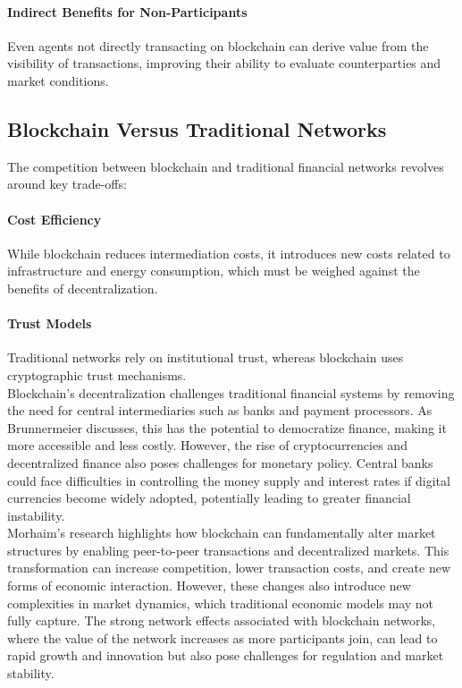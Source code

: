 \paragraph{Indirect Benefits for Non-Participants}
Even agents not directly transacting on blockchain can derive value from the visibility of transactions, improving their ability to evaluate counterparties and market conditions. \cite{iyengar_economics_2023}

\subsection{Blockchain Versus Traditional Networks}

The competition between blockchain and traditional financial networks revolves around key trade-offs:

\paragraph{Cost Efficiency}
While blockchain reduces intermediation costs, it introduces new costs related to infrastructure and energy consumption, which must be weighed against the benefits of decentralization.

\paragraph{Trust Models}
Traditional networks rely on institutional trust, whereas blockchain uses cryptographic trust mechanisms. \\

Blockchain's decentralization challenges traditional financial systems by removing the need for central intermediaries such as banks and payment processors. As Brunnermeier discusses, this has the potential to democratize finance, making it more accessible and less costly. However, the rise of cryptocurrencies and decentralized finance also poses challenges for monetary policy. Central banks could face difficulties in controlling the money supply and interest rates if digital currencies become widely adopted, potentially leading to greater financial instability.
\cite{abadi_blockchain_2022} \\

Morhaim’s research highlights how blockchain can fundamentally alter market structures by enabling peer-to-peer transactions and decentralized markets. This transformation can increase competition, lower transaction costs, and create new forms of economic interaction. However, these changes also introduce new complexities in market dynamics, which traditional economic models may not fully capture. The strong network effects associated with blockchain networks, where the value of the network increases as more participants join, can lead to rapid growth and innovation but also pose challenges for regulation and market stability.
\cite{morhaim_blockchain_2019}\\


